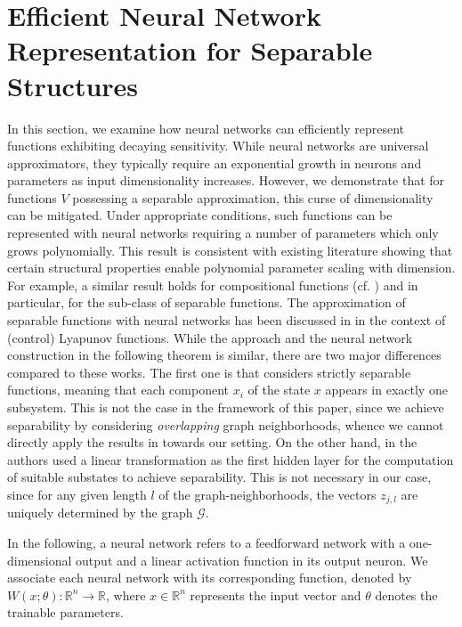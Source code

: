 \documentclass{article}
\begin{document}
\section{Efficient Neural Network Representation for Separable Structures}\label{sec:NN}

In this section, we examine how neural networks can efficiently represent functions exhibiting decaying sensitivity. While neural networks are universal approximators, they typically require an exponential growth in neurons and parameters as input dimensionality increases. However, we demonstrate that for functions $V$ possessing a separable approximation, this curse of dimensionality can be mitigated. Under appropriate conditions, such functions can be represented with neural networks requiring a number of parameters which only grows polynomially. This result is consistent with existing literature showing that certain structural properties enable polynomial parameter scaling with dimension. For example, a similar result holds for compositional functions (cf. \cite{kang2022}) and in particular, for the sub-class of separable functions. The approximation of separable functions with neural networks has been discussed in \cite{gruene2021_ComputingLyapunovFunctions,sperl2024} in the context of (control) Lyapunov functions. While the approach and the neural network construction in the following theorem is similar, there are two major differences compared to these works. The first one is that \cite{gruene2021_ComputingLyapunovFunctions,sperl2024} considers strictly separable functions, meaning that each component $x_i$ of the state $x$ appears in exactly one subsystem. This is not the case in the framework of this paper, since we achieve separability by considering \emph{overlapping} graph neighborhoods, whence we cannot directly apply the results in \cite{gruene2021_ComputingLyapunovFunctions,sperl2024} towards our setting. On the other hand, in \cite{gruene2021_ComputingLyapunovFunctions,sperl2024} the authors used a linear transformation as the first hidden layer for the computation of suitable substates to achieve separability. This is not necessary in our case, since for any given length $l$ of the graph-neighborhoods, the vectors $z_{j,l}$ are uniquely determined by the graph $\mathcal{G}$. 

In the following, a neural network refers to a feedforward network with a one-dimensional output and a linear activation function in its output neuron. We associate each neural network with its corresponding function, denoted by \( W(x; \theta) \colon \mathbb{R}^n \to \mathbb{R} \), where \( x \in \mathbb{R}^n \) represents the input vector and \( \theta \) denotes the trainable parameters.
\end{document}
